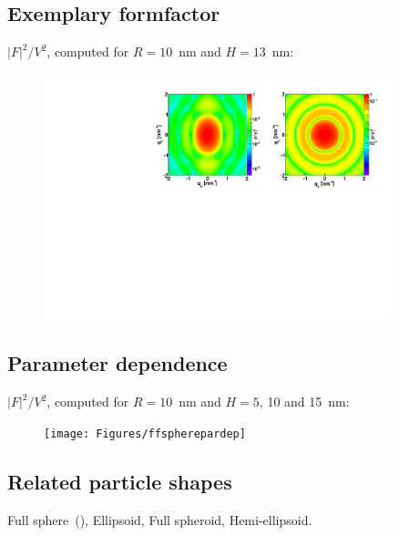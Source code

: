 \subsection{Exemplary formfactor}
$|F|^2/V^2$, computed for $R=10$~nm and $H=13$~nm:
\begin{figure}[h]
\begin{center}
\includegraphics[width=0.9\textwidth]{Figures/figffsphere}
\end{center}
\end{figure}

\par

\subsection{Parameter dependence}
$|F|^2/V^2$, computed for $R=10$~nm and $H=5$, 10 and 15~nm:
\begin{figure}[h]
\begin{center}
\texttt{[image: Figures/ffspherepardep]}
\end{center}
\end{figure}


\subsection{Related particle shapes}
Full sphere~(), Ellipsoid, Full spheroid, Hemi-ellipsoid.

